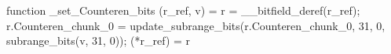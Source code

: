 function _set_Counteren_bits (r_ref, v) = {
    r = __bitfield_deref(r_ref);
    r.Counteren_chunk_0 = update_subrange_bits(r.Counteren_chunk_0, 31, 0, subrange_bits(v, 31, 0));
    (*r_ref) = r
}
